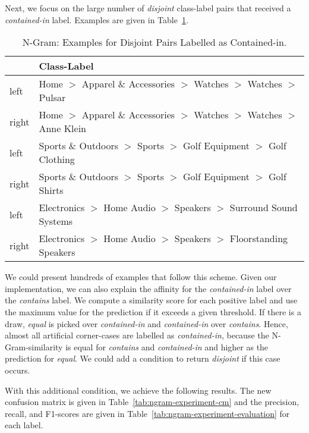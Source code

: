 Next, we focus on the large number of \emph{disjoint} class-label pairs that received a \emph{contained-in} label.
Examples are given in Table~\ref{tab:ngram-error1}.
\begin{table}[htbp]
    \begin{center}
        \begin{tabularx}{\textwidth}{lX}
            & Class-Label \\
            \hline
            left & Home $>$ Apparel \& Accessories $>$ Watches $>$ Watches $>$ Pulsar \\
            right & Home $>$ Apparel \& Accessories $>$ Watches $>$ Watches $>$ Anne Klein \\
            \hline
            left & Sports \& Outdoors $>$ Sports $>$ Golf Equipment $>$ Golf Clothing \\
            right & Sports \& Outdoors $>$ Sports $>$ Golf Equipment $>$ Golf Shirts \\
            \hline
            left & Electronics $>$ Home Audio $>$ Speakers $>$ Surround Sound Systems \\
            right & Electronics $>$ Home Audio $>$ Speakers $>$ Floorstanding Speakers \\
        \end{tabularx}
        \caption{N-Gram: Examples for Disjoint Pairs Labelled as Contained-in.}
        \label{tab:ngram-error1}
    \end{center}
\end{table}
We could present hundreds of examples that follow this scheme.
Given our implementation, we can also explain the affinity for the \emph{contained-in} label over the \emph{contains} label.
We compute a similarity score for each positive label and use the maximum value for the prediction if it exceeds a
given threshold.
If there is a draw, \emph{equal} is picked over \emph{contained-in} and \emph{contained-in} over \emph{contains}.
Hence, almost all artificial corner-cases are labelled as \emph{contained-in}, because the N-Gram-similarity is equal for
\emph{contains} and \emph{contained-in} and higher as the prediction for \emph{equal}.
We could add a condition to return \emph{disjoint} if this case occurs.

With this additional condition, we achieve the following results.
The new confusion matrix is given in Table~\ref{tab:ngram-experiment-cm} and the precision, recall, and F1-scores
are given in Table~\ref{tab:ngram-experiment-evaluation} for each label.

